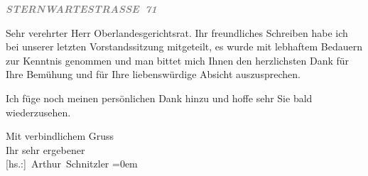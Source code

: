 \pstart
           \textcolor{gray}{\textbf{\textit{STERNWARTESTRASSE 71}}}\pend
           
\pstart{}Sehr verehrter Herr Oberlandesgerichtsrat.\pend\vspace{0.5em}
\pstart
           Ihr freundliches Schreiben habe ich bei unserer letzten Vorstandssitzung mitgeteilt, es wurde mit
               lebhaftem Bedauern zur Kenntnis genommen und man bittet mich Ihnen den herzlichsten
               Dank für Ihre Bemühung und für Ihre liebenswürdige Absicht auszusprechen.\pend
           
\pstart
           Ich füge noch meinen persönlichen Dank hinzu und hoffe sehr Sie bald
               wiederzusehen.\pend
           
\pstart
           Mit verbindlichem Gruss{\\[\baselineskip]}Ihr sehr ergebener{\\[\baselineskip]}\spacefill\mbox{{[}hs.:{]} Arthur Schnitzler}\pend
           \leftskip=0em{}\endnumbering{}  \newcommand{\dateiname}{L02358}\newcommand{\titel}{Arthur Schnitzler an Robert Adam, 20. 11. 1920}\newcommand{\editorInnen}{Martin Anton Müller und Gerd-Hermann Susen}
